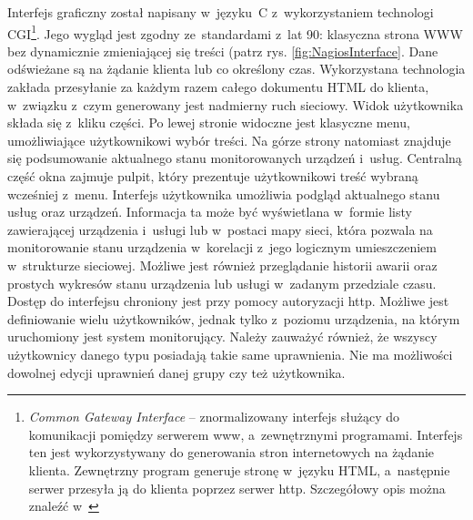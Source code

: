 Interfejs graficzny został napisany w~języku~C z~wykorzystaniem
technologi CGI\footnote{{\em Common Gateway Interface} --
  znormalizowany interfejs służący do komunikacji pomiędzy serwerem
  www, a~zewnętrznymi programami. Interfejs ten jest wykorzystywany do
  generowania stron internetowych na żądanie klienta. Zewnętrzny
  program generuje stronę w~języku HTML, a~następnie serwer przesyła
  ją do klienta poprzez serwer http. Szczegółowy opis można znaleźć
  w~\cite{www:CGI}}. Jego wygląd jest zgodny ze~standardami z~lat 90:
klasyczna strona WWW bez dynamicznie zmieniającej się treści (patrz
rys. \ref{fig:NagiosInterface}. Dane odświeżane są na żądanie klienta
lub co określony czas. Wykorzystana technologia zakłada przesyłanie za
każdym razem całego dokumentu HTML do klienta, w~związku z~czym
generowany jest nadmierny ruch sieciowy. Widok użytkownika składa się
z~kliku części. Po lewej stronie widoczne jest klasyczne menu,
umożliwiające użytkownikowi wybór treści. Na górze strony natomiast
znajduje się podsumowanie aktualnego stanu monitorowanych urządzeń
i~usług. Centralną część okna zajmuje pulpit, który prezentuje
użytkownikowi treść wybraną wcześniej z~menu. Interfejs użytkownika
umożliwia podgląd aktualnego stanu usług oraz urządzeń. Informacja ta
może być wyświetlana w~formie listy zawierającej urządzenia i~usługi
lub w~postaci mapy sieci, która pozwala na monitorowanie stanu
urządzenia w~korelacji z~jego logicznym umieszczeniem w~strukturze
sieciowej. Możliwe jest również przeglądanie historii awarii oraz
prostych wykresów stanu urządzenia lub usługi w~zadanym przedziale
czasu. Dostęp do interfejsu chroniony jest przy pomocy autoryzacji
http. Możliwe jest definiowanie wielu użytkowników, jednak tylko
z~poziomu urządzenia, na którym uruchomiony jest system
monitorujący. Należy zauważyć również, że wszyscy użytkownicy danego
typu posiadają takie same uprawnienia. Nie ma możliwości dowolnej
edycji uprawnień danej grupy czy też użytkownika.

